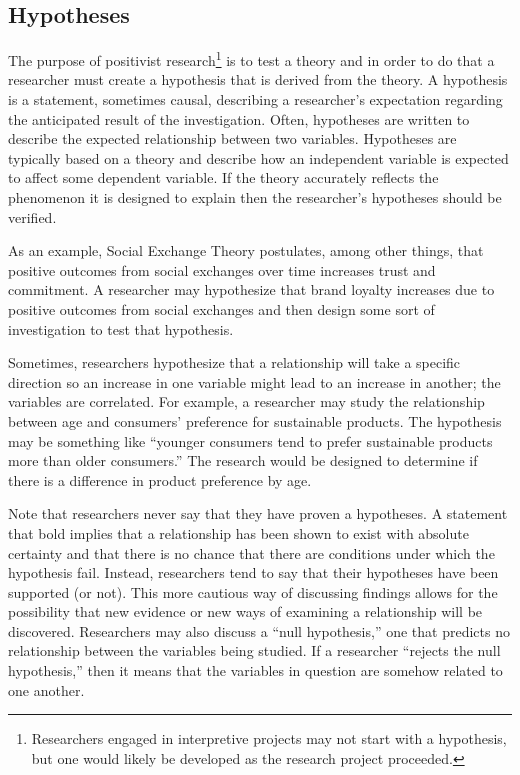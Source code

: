 \subsection{Hypotheses}

The purpose of \gls{positivist} research\footnote{Researchers engaged in interpretive projects may not start with a hypothesis, but one would likely be developed as the research project proceeded.} is to test a theory and in order to do that a researcher must create a \gls{hypothesis} that is derived from the theory. A hypothesis is a statement, sometimes causal, describing a researcher's expectation regarding the anticipated result of the investigation. Often, hypotheses are written to describe the expected relationship between two \glspl{variable}. Hypotheses are typically based on a theory and describe how an independent variable is expected to affect some dependent variable. If the theory accurately reflects the phenomenon it is designed to explain then the researcher's hypotheses should be verified.

As an example, Social Exchange Theory postulates, among other things, that positive outcomes from social exchanges over time increases trust and commitment\cite{lambe2001social}. A researcher may hypothesize that brand loyalty increases due to positive outcomes from social exchanges and then design some sort of investigation to test that hypothesis.

Sometimes, researchers hypothesize that a relationship will take a specific direction so an increase in one variable might lead to an increase in another; the variables are correlated. For example, a researcher may study the relationship between age and consumers' preference for sustainable products. The hypothesis may be something like ``younger consumers tend to prefer sustainable products more than older consumers.'' The research would be designed to determine if there is a difference in product preference by age. 

Note that researchers never say that they have proven a hypotheses. A statement that bold implies that a relationship has been shown to exist with absolute certainty and that there is no chance that there are conditions under which the hypothesis fail. Instead, researchers tend to say that their hypotheses have been supported (or not). This more cautious way of discussing findings allows for the possibility that new evidence or new ways of examining a relationship will be discovered. Researchers may also discuss a ``null hypothesis,'' one that predicts no relationship between the variables being studied. If a researcher ``rejects the null hypothesis,'' then it means that the variables in question are somehow related to one another.

